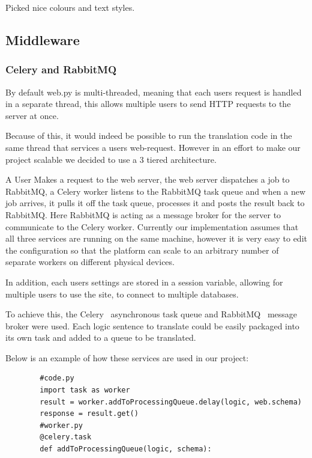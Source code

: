 \documentclass[a4paper, 11pt]{article}
\begin{document}
      Picked nice colours and text styles.

  \subsection{Middleware}
    \subsubsection{Celery and RabbitMQ}
      By default web.py is multi-threaded, meaning that each users request is
      handled in a separate thread, this allows multiple users to send HTTP
      requests to the server at once. 
      
      Because of this, it would indeed be possible to run the translation code 
      in the same thread that services a users web-request. However in an effort 
      to make our project scalable we decided to use a 3 tiered architecture. 
      
      A User Makes a request to the web server, the web server dispatches a job 
      to RabbitMQ, a Celery worker listens to the RabbitMQ task queue and when a 
      new job arrives, it pulls it off the task queue, processes it and posts the 
      result back to RabbitMQ. Here RabbitMQ is acting as a message broker for the
      server to communicate to the Celery worker. Currently our implementation 
      assumes that all three services are running on the same machine, however it
      is very easy to edit the configuration so that the platform can scale to an 
      arbitrary number of separate workers on different physical devices.

      In addition, each users settings are stored in a session variable,
      allowing for multiple users to use the site, to connect to multiple
      databases.


      To achieve this, the Celery~\cite{celery} asynchronous
      task queue and RabbitMQ~\cite{rabbitmq} message broker were
      used. Each logic sentence to translate could be easily packaged into its
      own task and added to a queue to be translated.

      Below is an example of how these services are used in our project: 
      \begin{verbatim}
        #code.py
        import task as worker
        result = worker.addToProcessingQueue.delay(logic, web.schema)
        response = result.get()
        #worker.py
        @celery.task
        def addToProcessingQueue(logic, schema):
      \end{verbatim}
\end{document}
